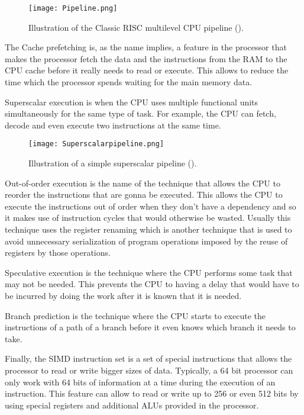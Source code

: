 \begin{figure}[H]
	\centering
	\caption{Illustration of the Classic RISC multilevel CPU pipeline (\cite{CPU_Pipeline}).}
	\label{Pipeline.}
	\texttt{[image: Pipeline.png]}
\end{figure}

\par
The Cache prefetching is, as the name implies, a feature in the processor that makes the processor fetch the data and the instructions from the RAM to the CPU cache before it really needs to read or execute.
This allows to reduce the time which the processor spends waiting for the main memory data.

\par
Superscalar execution is when the CPU uses multiple functional units simultaneously for the same type of task.
For example, the CPU can fetch, decode and even execute two instructions at the same time.

\begin{figure}[H]
	\centering
	\caption{Illustration of a simple superscalar pipeline (\cite{CPU_SuperPipeline}).}
	\label{Superscalar.}
	\texttt{[image: Superscalarpipeline.png]}
\end{figure}

\par
Out-of-order execution is the name of the technique that allows the CPU to reorder the instructions that are gonna be executed.
This allows the CPU to execute the instructions out of order when they don't have a dependency and so it makes use of instruction cycles that would otherwise be wasted.
Usually this technique uses the register renaming which is another technique that is used to avoid unnecessary serialization of program operations imposed by the reuse of registers by those operations.

\par
Speculative execution is the technique where the CPU performs some task that may not be needed.
This prevents the CPU to having a delay that would have to be incurred by doing the work after it is known that it is needed.

\par
Branch prediction is the technique where the CPU starts to execute the instructions of a path of a branch before it even knows which branch it needs to take.

\par
Finally, the SIMD instruction set is a set of special instructions that allows the processor to read or write bigger sizes of data.
Typically, a 64 bit processor can only work with 64 bits of information at a time during the execution of an instruction.
This feature can allow to read or write up to 256 or even 512 bits by using special registers and additional ALUs provided in the processor.

